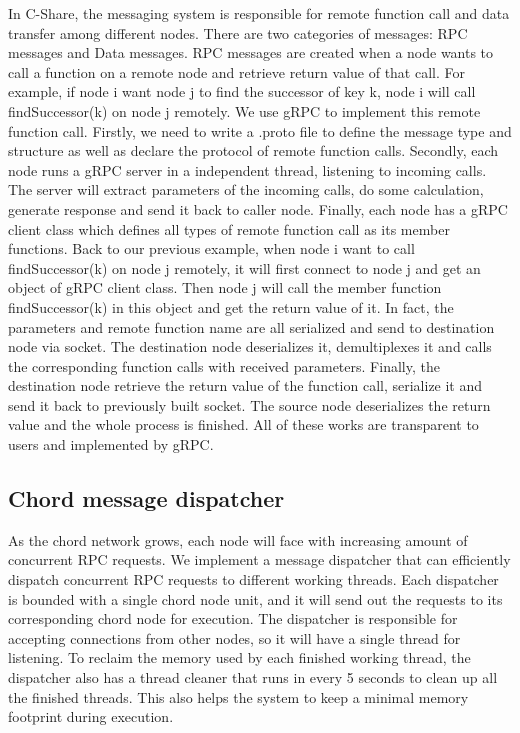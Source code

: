 \documentclass[letterpaper,twocolumn,10pt]{article}
\begin{document}
In C-Share, the messaging system is responsible for remote function call and data transfer among different nodes. There are two categories of messages: RPC messages and Data messages. RPC messages are created when a node wants to call a function on a remote node and retrieve return value of that call. For example, if node i want node j to find the successor of key k, node i will call findSuccessor(k) on node j remotely. We use gRPC to implement this remote function call. Firstly, we need to write a .proto file to define the message type and structure as well as declare the protocol of remote function calls. Secondly, each node runs a gRPC server in a independent thread, listening to incoming calls. The server will extract parameters of the incoming calls, do some calculation, generate response and send it back to caller node. Finally, each node has a gRPC client class which defines all types of remote function call as its member functions. Back to our previous example, when node i want to call findSuccessor(k) on node j remotely, it will first connect to node j and get an object of gRPC client class. Then node j will call the member function findSuccessor(k) in this object and get the return value of it. In fact, the parameters and remote function name are all serialized and send to destination node via socket. The destination node deserializes it, demultiplexes it and calls the corresponding function calls with received parameters. Finally, the destination node retrieve the return value of the function call, serialize it and send it back to previously built socket. The source node deserializes the return value and the whole process is finished. All of these works are transparent to users and implemented by gRPC. 

\subsection{Chord message dispatcher}

As the chord network grows, each node will face with increasing amount of concurrent RPC requests. We implement a message dispatcher that can efficiently dispatch concurrent RPC requests to different working threads. Each dispatcher is bounded with a single chord node unit, and it will send out the requests to its corresponding chord node for execution. The dispatcher is responsible for accepting connections from other nodes, so it will have a single thread for listening. To reclaim the memory used by each finished working thread, the dispatcher also has a thread cleaner that runs in every 5 seconds to clean up all the finished threads. This also helps the system to keep a minimal memory footprint during execution.
\end{document}
